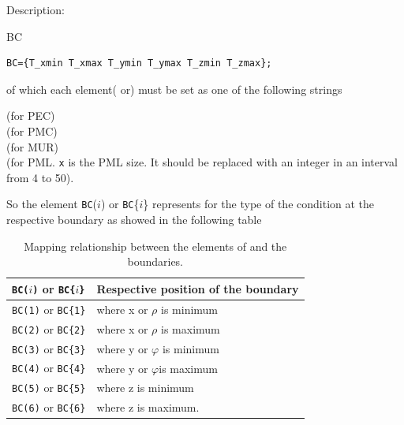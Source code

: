\begin{FontDescr}{Description:}
\begin{FontPara}{BC}
\begin{itemize}
\begin{myindentpar}
	  \begin{lstlisting}[caption={\matv{BC} in the form of a cell},label=BCincell]
 BC={T_xmin T_xmax T_ymin T_ymax T_zmin T_zmax};
	  \end{lstlisting}
	  of which   each  element( or)  must be set as one of the following strings
	  \begin{myindentpar}
	      \qquad   (for PEC)\\
	      \qquad   (for PMC)\\
	       \qquad  (for MUR)\\
	      \qquad   (for PML. \texttt{x} is  the PML size. It should be replaced with an integer in an interval from 4 to 50).
	  \end{myindentpar}
	\end{myindentpar}
\end{itemize}
	  So the element \texttt{BC}($i$) or \texttt{BC}\{$i$\} represents for the type of the  condition at the respective boundary as showed in the following table
	  \begin{table}[htb]\centering
	  \begin{tabular}{l|l}
	  \texttt{BC($i$)} or \texttt{BC\{$i$\}} & Respective position of the boundary\\ \hline
		 \texttt{BC(1)} or  \texttt{BC\{1\}} & where x or $\rho$ is minimum\\
		 \texttt{BC(2)} or  \texttt{BC\{2\}}& where x or $\rho$ is maximum\\
		 \texttt{BC(3)} or  \texttt{BC\{3\}}& where y or $\varphi$ is minimum\\
		 \texttt{BC(4)} or  \texttt{BC\{4\}}& where y or $\varphi$is maximum\\
		 \texttt{BC(5)} or  \texttt{BC\{5\}}& where z is minimum\\
		 \texttt{BC(6)} or  \texttt{BC\{6\}}& where z is maximum.
	  \label{Elements of BC and the rescpective boundaries}
	  \end{tabular}\caption{Mapping relationship between the elements of  and the  boundaries.}
	  \end{table}
	  

\end{FontPara}
\end{FontDescr}
